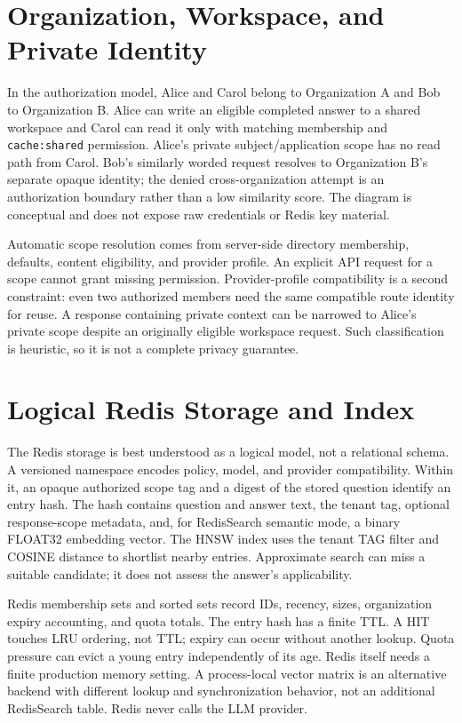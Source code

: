 \section{Organization, Workspace, and Private Identity}
In the authorization model, Alice and Carol belong to Organization A and Bob to Organization B. Alice can write an eligible completed answer to a shared workspace and Carol can read it only with matching membership and \texttt{cache:shared} permission. Alice's private subject/application scope has no read path from Carol. Bob's similarly worded request resolves to Organization B's separate opaque identity; the denied cross-organization attempt is an authorization boundary rather than a low similarity score. The diagram is conceptual and does not expose raw credentials or Redis key material.

Automatic scope resolution comes from server-side directory membership, defaults, content eligibility, and provider profile. An explicit API request for a scope cannot grant missing permission. Provider-profile compatibility is a second constraint: even two authorized members need the same compatible route identity for reuse. A response containing private context can be narrowed to Alice's private scope despite an originally eligible workspace request. Such classification is heuristic, so it is not a complete privacy guarantee.

\section{Logical Redis Storage and Index}
The Redis storage is best understood as a logical model, not a relational schema. A versioned namespace encodes policy, model, and provider compatibility. Within it, an opaque authorized scope tag and a digest of the stored question identify an entry hash. The hash contains question and answer text, the tenant tag, optional response-scope metadata, and, for RedisSearch semantic mode, a binary FLOAT32 embedding vector. The HNSW index uses the tenant TAG filter and COSINE distance to shortlist nearby entries. Approximate search can miss a suitable candidate; it does not assess the answer's applicability.

Redis membership sets and sorted sets record IDs, recency, sizes, organization expiry accounting, and quota totals. The entry hash has a finite TTL. A HIT touches LRU ordering, not TTL; expiry can occur without another lookup. Quota pressure can evict a young entry independently of its age. Redis itself needs a finite production memory setting. A process-local vector matrix is an alternative backend with different lookup and synchronization behavior, not an additional RedisSearch table. Redis never calls the LLM provider.

